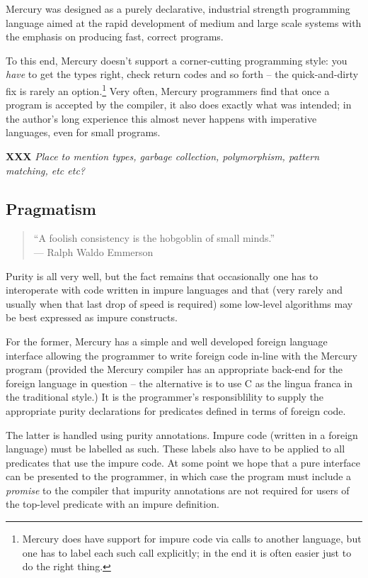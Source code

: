 \documentclass[a4paper,11pt,notitlepage,onecolumn]{article}
\newcommand{\XXX}[1]%
{{\small\textbf{XXX} \emph{#1}}}
\begin{document}
Mercury was designed as a purely declarative, industrial
strength programming language aimed at the rapid development
of medium and large scale systems with the emphasis on
producing fast, correct programs.

To this end, Mercury doesn't support a corner-cutting
programming style: you \emph{have} to get the types right, check
return codes and so forth -- the quick-and-dirty fix is rarely
an option.\footnote{Mercury does have support for impure code
via calls to another language, but one has to label each such
call explicitly; in the end it is often easier just to do the
right thing.}  Very often, Mercury programmers find that once
a program is accepted by the compiler, it also does exactly
what was intended; in the author's long experience this almost
never happens with imperative languages, even for small
programs.

\XXX{Place to mention types, garbage collection, polymorphism,
pattern matching, etc etc?}

\subsection{Pragmatism}

\begin{quote}
``A foolish consistency is the hobgoblin of small minds.'' \\
\hfill --- Ralph Waldo Emmerson
\end{quote}

Purity is all very well, but the fact remains that
occasionally one has to interoperate with code written in
impure languages and that (very rarely and usually when that
last drop of speed is required) some low-level algorithms may
be best expressed as impure constructs.

For the former, Mercury has a simple and well developed
foreign language interface allowing the programmer to write
foreign code in-line with the Mercury program (provided the
Mercury compiler has an appropriate back-end for the foreign
language in question -- the alternative is to use C as the
lingua franca in the traditional style.)  It is the
programmer's responsiblility to supply the appropriate purity
declarations for predicates defined in terms of foreign code.

The latter is handled using purity annotations.  Impure code
(written in a foreign language) must be labelled as such.
These labels also have to be applied to all predicates that
use the impure code.  At some point we hope that a pure
interface can be presented to the programmer, in which case
the program must include a \emph{promise} to the compiler that
impurity annotations are not required for users of the
top-level predicate with an impure definition.
\end{document}
